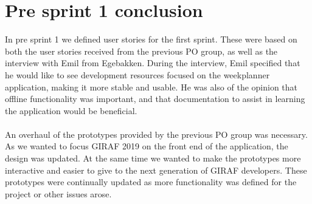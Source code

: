 \section{Pre sprint 1 conclusion}
In pre sprint 1 we defined user stories for the first sprint.
These were based on both the user stories received from the previous PO group, as well as the interview with Emil from Egebakken.
During the interview, Emil specified that he would like to see development resources focused on the weekplanner application, making it more stable and usable.
He was also of the opinion that offline functionality was important, and that documentation to assist in learning the application would be beneficial.
\\\\
An overhaul of the prototypes provided by the previous PO group was necessary.
As we wanted to focus GIRAF 2019 on the front end of the application, the design was updated.
At the same time we wanted to make the prototypes more interactive and easier to give to the next generation of GIRAF developers.
These prototypes were continually updated as more functionality was defined for the project or other issues arose. 